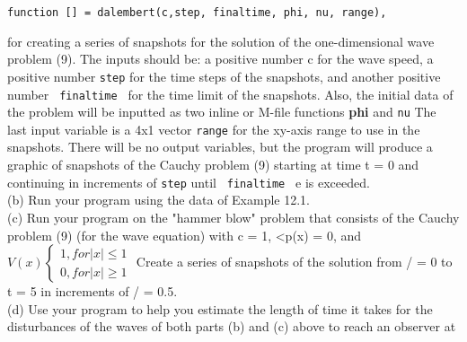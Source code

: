 \documentclass[../main.tex]{subfiles}
\begin{document}
\begin{verbatim}
function [] = dalembert(c,step, finaltime, phi, nu, range),  
\end{verbatim}
for creating a series of snapshots for the solution of the one-dimensional wave
problem (9). The inputs should be: a positive number c for the wave speed, a
positive number \texttt{step}  for the time steps of the snapshots, and another positive
number \texttt{ finaltime } for the time limit of the snapshots. Also, the initial data of
the problem will be inputted as two inline or M-file functions \textbf{phi} and \texttt{nu} The
last input variable is a 4x1 vector \texttt{range} for the xy-axis range to use in the
snapshots. There will be no output variables, but the program will produce a
graphic of snapshots of the Cauchy problem (9) starting at time t = 0 and
continuing in increments of \texttt{step} until \texttt{ finaltime } e is exceeded.\\
(b) Run your program using the data of Example 12.1.\\
(c) Run your program on the "hammer blow" problem that consists of the Cauchy
problem (9) (for the wave equation) with c = 1, <p(x) = 0, and
$V(x)
\begin{cases} 
1, for \vert x \vert \leqslant 1\\
0, for  \vert x\vert\geqslant 1
\end{cases}$
Create a series of snapshots of the solution from / = 0 to t = 5 in increments of / = 0.5.\\
(d) Use your program to help you estimate the length of time it takes for the
disturbances of the waves of both parts (b) and (c) above to reach an observer at
\end{document}
